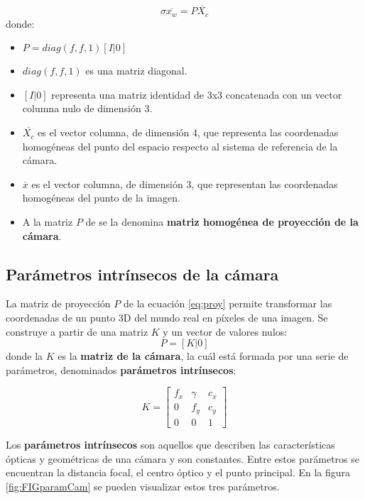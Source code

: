 \begin{equation}\label{eq:proy}
\sigma \overline{x_w} = P \overline{X_c}   
\end{equation}
donde:
\begin{itemize}
\item $P = diag(f, f, 1) [I|0]$
\item $diag(f, f, 1)$ es una matriz diagonal.
\item $[I|0]$ representa una matriz identidad de 3x3 concatenada con un vector columna nulo de dimensión 3.
\item $\overline{X_c}$  es el vector columna, de dimensión 4, que representa las coordenadas homogéneas del punto del espacio respecto al sistema de referencia de la cámara.
\item $\overline{x}$  es el vector columna, de dimensión 3, que representan las coordenadas homogéneas del punto de la imagen.
\item A la matriz $P$ de se la denomina \textbf{matriz homogénea de proyección de la cámara}.
\end{itemize}


\subsection{Parámetros intrínsecos de la cámara}
La matriz de proyección $P$ de la ecuación \ref{eq:proy} permite transformar las coordenadas de un punto 3D del mundo real en píxeles de una imagen. Se construye a partir de una matriz $K$ y un vector de valores nulos:
\begin{equation}
 P = [K|0] 
\end{equation}
donde la $K$ es la \textbf{matriz de la cámara}, la cuál está formada por una serie de parámetros, denominados \textbf{parámetros intrínsecos}:

\begin{equation}
  K =
  \begin{bmatrix}
    f_{x} & \gamma & {c_{x}} \\
    {0}&{f_{y}}&{c_{y}}\\
    {0}&{0}&{1}
  \end{bmatrix}
\end{equation}

Los \textbf{parámetros intrínsecos} son aquellos que describen las características ópticas y geométricas de una cámara y son constantes. Entre estos parámetros se encuentran la distancia focal, el centro óptico y el punto principal. En la figura \ref{fig:FIGparamCam} se pueden visualizar estos tres parámetros.

